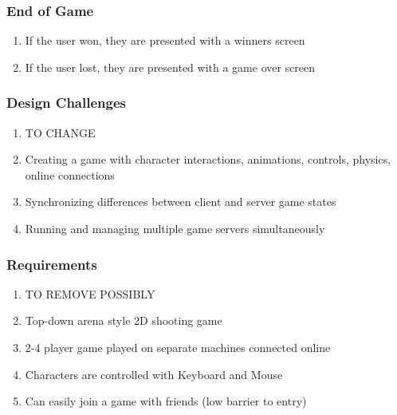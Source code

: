 \documentclass{beamer}
\begin{document}
\begin{frame}
\frametitle{End of Game}
\begin{enumerate}
  \item If the user won, they are presented with a winners screen
  \item If the user lost, they are presented with a game over screen
\end{enumerate}
\end{frame}

\begin{frame}
\frametitle{Design Challenges}
\begin{enumerate}
  \item TO CHANGE
  \item Creating a game with character interactions, animations, controls, physics, online connections
  \item Synchronizing differences between client and server game states
  \item Running and managing multiple game servers simultaneously
\end{enumerate}
\end{frame}

\begin{frame}
\frametitle{Requirements}
\begin{enumerate}
  \item TO REMOVE POSSIBLY
  \item Top-down arena style 2D shooting game
  \item 2-4 player game played on separate machines connected online
  \item Characters are controlled with Keyboard and Mouse
  \item Can easily join a game with friends (low barrier to entry)
\end{enumerate}
\end{frame}
\end{document}
